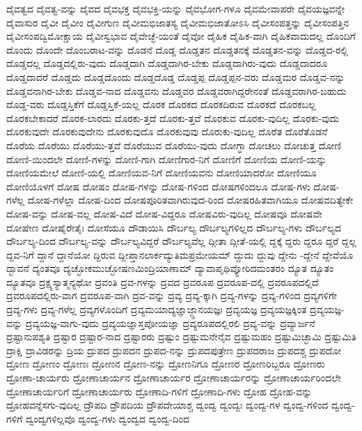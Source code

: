 {ದೈವತ್ವದ
ದೈವತ್ವ-ವನ್ನು
ದೈವದ
ದೈವಭಕ್ತ
ದೈವಭಕ್ತಿ-ಯನ್ನು
ದೈವಭೋಗ-ಗಳೂ
ದೈವಮೇವಾಪರೇ
ದೈವಯಜ್ಞವನ್ನೇ
ದೈವಾಸುರ
ದೈವೀ
ದೈವೀಂ
ದೈವೀಗುಣ
ದೈವೀಮಭಿಜಾತಸ್ಯ
ದೈವೀಮಭಿಜಾತೋಽಸಿ
ದೈವೀಸಂಪತ್ತನ್ನು
ದೈವೀಸಂಪತ್ತಿನ
ದೈವೀಸಂಪದ್ವಿಮೋಕ್ಷಾಯ
ದೈವೀಸ್ವಭಾವ
ದೈವೇಚ್ಛೆ-ಯಂತೆ
ದೈವೋ
ದೈಹಿಕ
ದೈಹಿಕ-ವಾಗಿ
ದೈಹಿಕವಾದುದಲ್ಲ
ದೊಂದಿಗೆ
ದೊಂದು
ದೊಂದೇ
ದೊಂಬರಾಟ-ವನ್ನು
ದೊಡನೆ
ದೊಡ್ಡ
ದೊಡ್ಡತನ
ದೊಡ್ಡತನಕ್ಕೆ
ದೊಡ್ಡತನ-ವನ್ನು
ದೊಡ್ಡದ-ರಲ್ಲಿ
ದೊಡ್ಡದಲ್ಲ
ದೊಡ್ಡದಲ್ಲಿರು-ವುದು
ದೊಡ್ಡದಾಗಿ
ದೊಡ್ಡದಾಗಿರ-ಬೇಕು
ದೊಡ್ಡದಾಗಿರು-ವುದು
ದೊಡ್ಡದಾದರೂ
ದೊಡ್ಡದಾದರೆ
ದೊಡ್ಡದು
ದೊಡ್ಡದೊಂದು
ದೊಡ್ಡದೊಡ್ಡ
ದೊಡ್ಡಪ್ಪ
ದೊಡ್ಡಪ್ಪನ-ವರು
ದೊಡ್ಡಮರ
ದೊಡ್ಡವ-ನನ್ನು
ದೊಡ್ಡವನಾಗಿರ-ಬೇಕು
ದೊಡ್ಡವ-ನಾದ
ದೊಡ್ಡವನು
ದೊಡ್ಡವರ
ದೊಡ್ಡವರಾಗಿದ್ದರೇನಂತೆ
ದೊಡ್ಡವರಾಗಿರ-ಬಹುದು
ದೊಡ್ಡ-ವರು
ದೊಡ್ಡಸ್ತಿಕೆಗೆ
ದೊಡ್ಡಸ್ತಿಕೆ-ಯಲ್ಲ
ದೊರಕ
ದೊರಕದ
ದೊರಕದಿರುವ
ದೊರಕದೆ
ದೊರಕಬಲ್ಲ
ದೊರಕಬೇಕಾದರೆ
ದೊರಕ-ಲಾರದು
ದೊರಕು-ತ್ತದೆ
ದೊರಕು-ತ್ತವೆ
ದೊರಕುವ
ದೊರಕು-ವುದಿಲ್ಲ
ದೊರಕು-ವುದು
ದೊರಕುವುದೇ
ದೊರಕುವುದೇನು
ದೊರಕುವುದೊ
ದೊರಕುವುವು
ದೊರುಕು-ವುದಿಲ್ಲ
ದೊರೆತ
ದೊರೆತೊಡನೆ
ದೊರೆಯ
ದೊರೆಯು
ದೊರೆಯು-ತ್ತವೆ
ದೊರೆಯುವ
ದೊರೆಯು-ವುದು
ದೋಗ್ಧಾ
ದೋಚಲು
ದೋಚುತ್ತ
ದೋಣಿ
ದೋಣಿ-ಯಿಂದಲೇ
ದೋಣಿ-ಗಳನ್ನು
ದೋಣಿ-ಗಾಗಿ
ದೋಣಿಗಾರ-ನಿಗೆ
ದೋಣಿಗೆ
ದೋಣಿಯ
ದೋಣಿ-ಯನ್ನು
ದೋಣಿಯಮೇಲೆ
ದೋಣಿ-ಯಲ್ಲಿ
ದೋಣಿಯವ-ನಿಗೆ
ದೋಣಿಯವನು
ದೋಣಿಯಾದರೋ
ದೋಣಿಯೂ
ದೋಣಿಯೊಳಗೆ
ದೋಷ
ದೋಷಂ
ದೋಷ-ಗಳನ್ನು
ದೋಷ-ಗಳಿಂದ
ದೋಷಗಳಿಂದಲೂ
ದೋಷ-ಗಳು
ದೋಷ-ಗಳೆಲ್ಲ
ದೋಷ-ಗಳೆಲ್ಲಾ
ದೋಷ-ದಿಂದ
ದೋಷಪೂರಿತವಾಗಿರುವುದ-ರಿಂದ
ದೋಷರಹಿತವಾಗಿಯೂ
ದೋಷವದಿತ್ಯೇಕೇ
ದೋಷ-ವನ್ನು
ದೋಷ-ವಲ್ಲ
ದೋಷ-ವಿದೆ
ದೋಷ-ವಿದ್ದರೂ
ದೋಷವಿರು-ವುದಿಲ್ಲ
ದೋಷವೂ
ದೋಷವೇ
ದೋಷೇಣ
ದೋಷೈರೇತೈಃ
ದೋಸೆಯೂ
ದೌಡಾಯಿಸಿ
ದೌರ್ಬಲ್ಯ
ದೌರ್ಬಲ್ಯಗಳಿಲ್ಲದ
ದೌರ್ಬಲ್ಯ-ಗಳು
ದೌರ್ಬಲ್ಯದ
ದೌರ್ಬಲ್ಯ-ದಿಂದ
ದೌರ್ಬಲ್ಯ-ವನ್ನು
ದೌರ್ಬಲ್ಯವಿದ್ದರೆ
ದೌರ್ಬಲ್ಯವೆಲ್ಲ
ದ್ಗೀತಾ
ದ್ಗೀತೆ-ಯಲ್ಲಿ
ದ್ದಕ್ಕೆ
ದ್ದರು
ದ್ದರೂ
ದ್ದರೆ
ದ್ದಲ್ಲ
ದ್ದವ-ನಿಗೆ
ದ್ದಾನೆ
ದ್ದಾನೆಯೋ
ದ್ದಿರುವ
ದ್ದೀಪ್ತಾನಲಾರ್ಕದ್ಯುತಿಮಪ್ರಮೇಯಮ್
ದ್ದುದು
ದ್ದುವು
ದ್ದೇನು
-ದ್ದೇನೆ
ದ್ದೇವೆಯೊ
ದ್ಭಾವನೆ
ದ್ಯಂತವೂ
ದ್ಯಚ್ಛೋಕಮುಚ್ಛೋಷಣಮಿಂದ್ರಿಯಾಣಾಮ್
ದ್ಯಾವಾಪೃಥಿವ್ಯೋರಿದಮಂತರಂ
ದ್ಯೂತ
ದ್ಯೂತಂ
ದ್ಯೂತವೂ
ದ್ರಕ್ಷ್ಯಸ್ಯಾತ್ಮನ್ಯಥೋ
ದ್ರವಂತಿ
ದ್ರವ-ಗಳನ್ನು
ದ್ರವದ
ದ್ರವರೂಪ
ದ್ರವರೂಪ-ದಲ್ಲಿ
ದ್ರವರೂಪದಲ್ಲಿದೆ
ದ್ರವರೂಪದಲ್ಲಿರು-ವಾಗ
ದ್ರವರೂಪ-ವಾಗಿ
ದ್ರವ-ವನ್ನು
ದ್ರವ್ಯ
ದ್ರವ್ಯ-ಕ್ಕಾಗಿ
ದ್ರವ್ಯ-ಗಳನ್ನು
ದ್ರವ್ಯ-ಗಳಿಂದ
ದ್ರವ್ಯಗಳಿಗೇ
ದ್ರವ್ಯ-ಗಳು
ದ್ರವ್ಯ-ಗಳೆಲ್ಲ
ದ್ರವ್ಯಗಳೊಂದಿಗೆ
ದ್ರವ್ಯಮಯಾದ್ಯಜ್ಞಾಜ್ಜ್ಞಾನಯಜ್ಞಃ
ದ್ರವ್ಯಯಜ್ಞ
ದ್ರವ್ಯಯಜ್ಞಕ್ಕಿಂತ
ದ್ರವ್ಯಯಜ್ಞ-ವನ್ನು
ದ್ರವ್ಯಯಜ್ಞ-ವಾಗು-ವುದು
ದ್ರವ್ಯಯಜ್ಞಾಸ್ತಪೋಯಜ್ಞಾ
ದ್ರವ್ಯರೂಪದಲ್ಲಿರಲಿ
ದ್ರವ್ಯ-ವನ್ನು
ದ್ರವ್ಯಾರ್ಜನೆ
ದ್ರಷ್ಟಾನುಪಶ್ಯತಿ
ದ್ರಷ್ಟಾರ
ದ್ರಷ್ಟಾರ-ನಾದ
ದ್ರಷ್ಟಾರರು
ದ್ರಷ್ಟುಂ
ದ್ರಷ್ಟುಮನೇನೈವ
ದ್ರಷ್ಟುಮಹಂ
ದ್ರಷ್ಟುಮಿಚ್ಛಾಮಿ
ದ್ರಷ್ಟುಮಿತಿ
ದ್ರಾಕ್ಷಿ
ದ್ರಾವಿಡರನ್ನು
ದ್ರಿಯ
ದ್ರುಪದ
ದ್ರುಪದನ
ದ್ರುಪದ-ನನ್ನು
ದ್ರುಪದಪುತ್ರೇಣ
ದ್ರುಪದರಾಜ
ದ್ರುಪದಶ್ಚ
ದ್ರುಪದೋ
ದ್ರೋಣ
ದ್ರೋಣಂ
ದ್ರೋಣಃ
ದ್ರೋಣನ
ದ್ರೋಣ-ನನ್ನು
ದ್ರೋಣನಿಗೂ
ದ್ರೋಣರ
ದ್ರೋಣರಿಬ್ಬರೂ
ದ್ರೋಣರು
ದ್ರೋಣಾ-ಚಾರ್ಯರು
ದ್ರೋಣಾಚಾರ್ಯನ
ದ್ರೋಣಾಚಾರ್ಯರ
ದ್ರೋಣಾಚಾರ್ಯರನ್ನು
ದ್ರೋಣಾಚಾರ್ಯರಿಂದಲೇ
ದ್ರೋಣಾಚಾರ್ಯರಿಗೆ
ದ್ರೋಣಾಚಾರ್ಯರು
ದ್ರೋಣಾದಿ-ಗಳಿಗೆ
ದ್ರೋಣಾದಿ-ಗಳು
ದ್ರೋಹ
ದ್ರೋಹ-ವನ್ನು
ದ್ರೋಹವನ್ನೆಸಗು-ವುದಿಲ್ಲ
ದ್ರೌಪದಿ
ದ್ರೌಪದಿಯ
ದ್ರೌಪದೇಯಾಶ್ಚ
ದ್ವಂದ್ವ
ದ್ವಂದ್ವಃ
ದ್ವಂದ್ವ-ಗಳ
ದ್ವಂದ್ವ-ಗಳಿಂದ
ದ್ವಂದ್ವ-ಗಳಿಗೆ
ದ್ವಂದ್ವಗಳಿಲ್ಲವೊ
ದ್ವಂದ್ವ-ಗಳು
ದ್ವಂದ್ವದ
ದ್ವಂದ್ವ-ದಿಂದ
}
